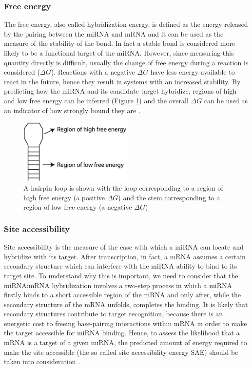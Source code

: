 \subsubsection{Free energy}
The free energy, also called hybridization energy,  is defined as the energy released by the pairing between the miRNA and mRNA and it can be used as the measure of the stability of the bond. In fact a stable bond is considered more likely to be a functional target of the miRNA. However, since measuring this quantity directly is difficult, usually the change of free energy during a reaction is considered ($\Delta G$). Reactions with a negative $\Delta G$ have less energy available to react in the future, hence they result in systems with an increased stability. By predicting how the miRNA and its candidate target hybridize, regions of high and low free energy can be inferred (Figure \ref{fig:free_energy}) and the overall $\Delta G$ can be used as an indicator of how strongly bound they are \cite{free_energy_survey}.

\begin{figure}[hbt!]
	\centering
	\includegraphics[width=0.5\textwidth]{Figures/free_energy}
	\caption{A hairpin loop is shown with the loop corresponding to a region of high free energy (a positive $\Delta G$) and the stem corresponding to a region of low free energy (a negative $\Delta G$)}
	\label{fig:free_energy}
\end{figure}

\subsubsection{Site accessibility}
Site accessibility is the measure of the ease with which a miRNA can locate and hybridize with its target. After transcription, in fact,  a mRNA assumes a certain secondary structure which can interfere with the miRNA ability to bind to its target site. To understand why this is important, we need to consider that the miRNA:mRNA hybridization involves  a two-step process in which a miRNA firstly binds to a short accessible region of the mRNA and only after, while the secondary structure of the mRNA unfolds, completes the binding.  It is likely that secondary structures contribute to target recognition, because there is an energetic cost to freeing base-pairing interactions within mRNA in order to make the target accessible for miRNA binding. Hence, to assess the likelihood that a mRNA is a target of a given miRNA, the predicted amount of energy required to make the site accessible (the so called site accessibility energy SAE) should be taken into consideration \cite{accessibility_nrg_role}.

